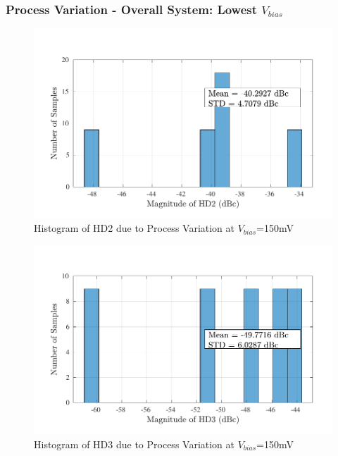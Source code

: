 \subsubsection{Process Variation - Overall System: Lowest $V_{bias}$}
\begin{figure} [H]
\centering
\includegraphics[scale=1]{Figures/Corners/Overall/Proc_Min/PDFs/Proc_Min_hd2.pdf}
\caption{Histogram of HD2 due to Process Variation at $V_{bias}$=150mV}
\end{figure}

\begin{figure} [H]
\centering
\includegraphics[scale=1]{Figures/Corners/Overall/Proc_Min/PDFs/Proc_Min_hd3.pdf}
\caption{Histogram of HD3 due to Process Variation at $V_{bias}$=150mV}
\end{figure}

